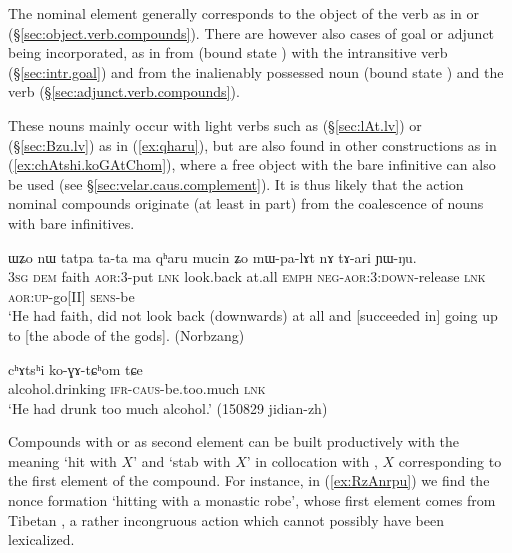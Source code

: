 The nominal element generally corresponds to the object of the verb as in  or  (§\ref{sec:object.verb.compounds}). There are however also cases of goal or adjunct being incorporated, as in  from  (bound state ) with the intransitive verb  (§\ref{sec:intr.goal}) and  from the inalienably possessed noun  (bound state ) and the verb  (§\ref{sec:adjunct.verb.compounds}).

These nouns mainly occur with light verbs such as  (§\ref{sec:lAt.lv}) or   (§\ref{sec:Bzu.lv})  as in  (\ref{ex:qharu}), but are also found in other constructions as in (\ref{ex:chAtshi.koGAtChom}), where a free object  with the bare infinitive  can also be used (see §\ref{sec:velar.caus.complement}). It is thus likely that the action nominal compounds originate (at least in part) from the coalescence of nouns with bare infinitives.

\begin{exe}
\ex \label{ex:qharu}
\gll ɯʑo nɯ  tatpa ta-ta ma qʰaru mucin ʑo mɯ-pa-lɤt nɤ tɤ-ari ɲɯ-ŋu. \\
\textsc{3sg} \textsc{dem} faith \textsc{aor}:3\flobv{}-put \textsc{lnk} look.back at.all \textsc{emph} \textsc{neg}-\textsc{aor}:3\flobv{}:\textsc{down}-release \textsc{lnk} \textsc{aor}:\textsc{up}-go[II] \textsc{sens}-be \\
\glt `He had faith, did not look back (downwards) at all and [succeeded in] going up to [the abode of the gods]. (Norbzang)
\end{exe}

\begin{exe}
\ex \label{ex:chAtshi.koGAtChom}
 \gll cʰɤtsʰi ko-ɣɤ-tɕʰom tɕe  \\
 alcohol.drinking \textsc{ifr}-\textsc{caus}-be.too.much \textsc{lnk} \\
\glt `He had drunk too much alcohol.' (150829 jidian-zh) 
\end{exe}

Compounds with  or  as second element can be built productively with the meaning `hit with $X$' and `stab with $X$' in collocation with , $X$ corresponding to the first element of the compound. For instance, in (\ref{ex:RzAnrpu}) we find the nonce formation  `hitting with a monastic robe', whose first element  comes from Tibetan , a rather incongruous action which cannot possibly have been lexicalized.
 
